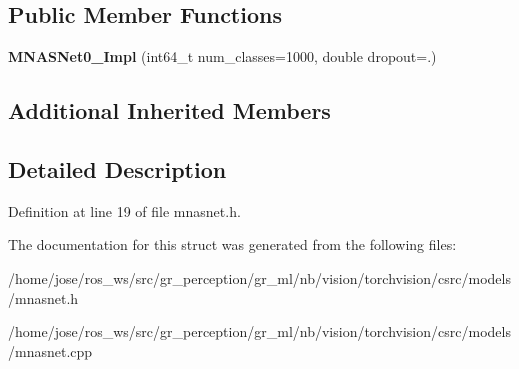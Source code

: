 \subsection*{Public Member Functions}
\begin{DoxyCompactItemize}
\item 
\mbox{\label{structvision_1_1models_1_1MNASNet0__5Impl_a6c4f23900fd5fa5dff79ed9e9a74d65b}} 
{\bfseries M\+N\+A\+S\+Net0\+\_\+Impl} (int64\+\_\+t num\+\_\+classes=1000, double dropout=.)
\end{DoxyCompactItemize}
\subsection*{Additional Inherited Members}


\subsection{Detailed Description}


Definition at line 19 of file mnasnet.\+h.



The documentation for this struct was generated from the following files\+:\begin{DoxyCompactItemize}
\item 
/home/jose/ros\+\_\+ws/src/gr\+\_\+perception/gr\+\_\+ml/nb/vision/torchvision/csrc/models/mnasnet.\+h\item 
/home/jose/ros\+\_\+ws/src/gr\+\_\+perception/gr\+\_\+ml/nb/vision/torchvision/csrc/models/mnasnet.\+cpp\end{DoxyCompactItemize}
